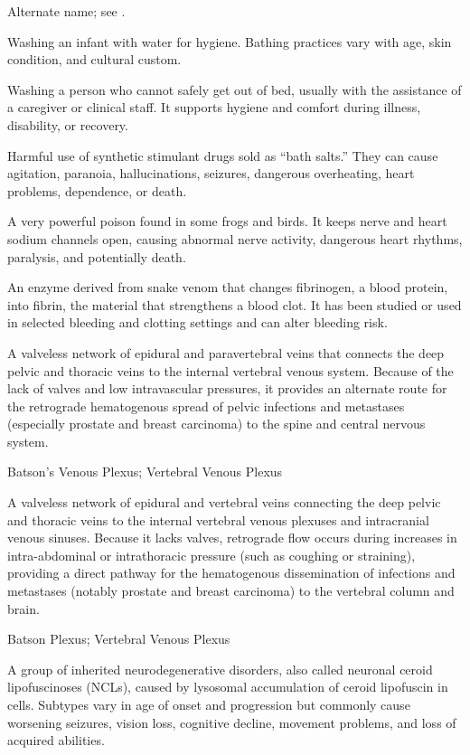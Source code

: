  Alternate name; see .

 Washing an infant with water for hygiene. Bathing practices vary with age, skin condition, and cultural custom.

 Washing a person who cannot safely get out
of bed, usually with the assistance of a caregiver or clinical staff. It
supports hygiene and comfort during illness, disability, or recovery.

 Harmful use of synthetic stimulant drugs sold as “bath salts.” They can cause agitation, paranoia, hallucinations, seizures, dangerous overheating, heart problems, dependence, or death.

 A very powerful poison found in some frogs and birds. It keeps nerve and heart sodium channels open, causing abnormal nerve activity, dangerous heart rhythms, paralysis, and potentially death.

 An enzyme derived from snake venom that changes fibrinogen, a blood protein, into fibrin, the material that strengthens a blood clot. It has been studied or used in selected bleeding and clotting settings and can alter bleeding risk.

 A valveless network of epidural and paravertebral veins that connects the deep pelvic and thoracic veins to the internal vertebral venous system. Because of the lack of valves and low intravascular pressures, it provides an alternate route for the retrograde hematogenous spread of pelvic infections and metastases (especially prostate and breast carcinoma) to the spine and central nervous system.

\synonyms
Batson's Venous Plexus; Vertebral Venous Plexus

 A valveless network of epidural and vertebral veins connecting the deep pelvic and thoracic veins to the internal vertebral venous plexuses and intracranial venous sinuses. Because it lacks valves, retrograde flow occurs during increases in intra-abdominal or intrathoracic pressure (such as coughing or straining), providing a direct pathway for the hematogenous dissemination of infections and metastases (notably prostate and breast carcinoma) to the vertebral column and brain.

\synonyms
Batson Plexus; Vertebral Venous Plexus

 A group of inherited neurodegenerative disorders, also called neuronal ceroid lipofuscinoses (NCLs), caused by lysosomal accumulation of ceroid lipofuscin in cells. Subtypes vary in age of onset and progression but commonly cause worsening seizures, vision loss, cognitive decline, movement problems, and loss of acquired abilities.

